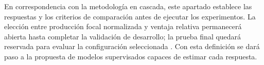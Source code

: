 En correspondencia con la metodología en cascada, este apartado establece las respuestas y los criterios de comparación antes de ejecutar los experimentos. La elección entre producción focal normalizada y ventaja relativa permanecerá abierta hasta completar la validación de desarrollo; la prueba final quedará reservada para evaluar la configuración seleccionada \cite{cawley2010selection}. Con esta definición se dará paso a la propuesta de modelos supervisados capaces de estimar cada respuesta.
